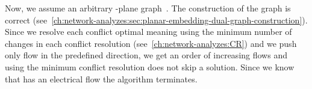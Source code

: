     Now, we assume an arbitrary \source-\sink plane graph~. The
    construction of the graph is correct
    (see~\cref{ch:network-analyzes:sec:planar-embedding-dual-graph-construction}).
    Since we resolve each conflict optimal meaning using the minimum number of
    changes in each conflict resolution (see~\cref{ch:network-analyzes:CR}) and
    we push only flow in the predefined direction, we get an order of increasing
    flows and using the minimum conflict resolution does not skip a solution.
    Since we know that
     has an electrical flow the algorithm terminates.
% 
% 

% 
% 
% 
% 

